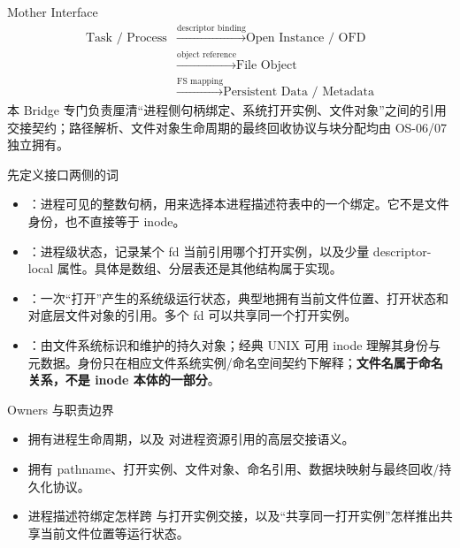 \documentclass[UTF8,fontset=none,11pt,a4paper]{ctexart}
\begin{document}

\begin{corebox}{Mother Interface}
\[
\boxed{
\begin{aligned}
\text{Task / Process} &\xrightarrow{\text{descriptor binding}} \text{Open Instance / OFD} \\
&\xrightarrow{\text{object reference}} \text{File Object} \\
&\xrightarrow{\text{FS mapping}} \text{Persistent Data / Metadata}
\end{aligned}
}
\]
本 Bridge 专门负责厘清“进程侧句柄绑定、系统打开实例、文件对象”之间的引用交接契约；路径解析、文件对象生命周期的最终回收协议与块分配均由 OS-06/07 独立拥有。
\end{corebox}

\begin{methodbox}{先定义接口两侧的词}
\begin{itemize}
  \item {}：进程可见的整数句柄，用来选择本进程描述符表中的一个绑定。它不是文件身份，也不直接等于 inode。
  \item {}：进程级状态，记录某个 fd 当前引用哪个打开实例，以及少量 descriptor-local 属性。具体是数组、分层表还是其他结构属于实现。
  \item {}：一次“打开”产生的系统级运行状态，典型地拥有当前文件位置、打开状态和对底层文件对象的引用。多个 fd 可以共享同一个打开实例。
  \item {}：由文件系统标识和维护的持久对象；经典 UNIX 可用 inode 理解其身份与元数据。身份只在相应文件系统实例/命名空间契约下解释；\textbf{文件名属于命名关系，不是 inode 本体的一部分}。
\end{itemize}
\end{methodbox}

\begin{methodbox}{Owners 与职责边界}
\begin{itemize}
  \item {}拥有进程生命周期，以及  对进程资源引用的高层交接语义。
  \item {}拥有 pathname、打开实例、文件对象、命名引用、数据块映射与最终回收/持久化协议。
  \item {}进程描述符绑定怎样跨  与打开实例交接，以及“共享同一打开实例”怎样推出共享当前文件位置等运行状态。
\end{itemize}
\end{methodbox}
\end{document}
